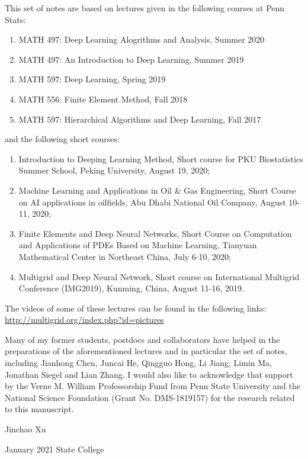 \documentclass[leqno,labelfig,psfigt,colorlinks]{svmono}
\begin{document}
This set of notes are based on lectures given in the following courses
at Penn State:
\begin{enumerate}
\item MATH 497: Deep Learning Alogrithms and Analysis, Summer 2020 
\item MATH 497: An Introduction to Deep Learning, Summer 2019
\item MATH 597: Deep Learning, Spring 2019 
\item MATH 556: Finite Element Method, Fall 2018
\item MATH 597: Hierarchical Algorithms and Deep Learning, Fall 2017
\end{enumerate}
and the following short courses:
\begin{enumerate}
\item Introduction to Deeping Learning Method, Short course for PKU Biostatistics Summer School, Peking University, August 19, 2020; 
\item Machine Learning and Applications in Oil \& Gas Engineering, Short Course on AI applications in oilfields, Abu Dhabi National Oil Company, August 10-11, 2020;
\item Finite Elements and Deep Neural Networks, Short Course on Computation and Applications of PDEs Based on Machine Learning, Tianyuan Mathematical Center in Northeast China, July 6-10, 2020;
\item Multigrid and Deep Neural Network, Short course on International Multigrid Conference (IMG2019), Kunming, China, August 11-16, 2019.
\end{enumerate}

The videos of some of these lectures can be found in the following links: 
\href{http://multigrid.org/index.php?id=pictures}{http://multigrid.org/index.php?id=pictures}

Many of my former students, postdocs and collaborators have helped in
the preparations of the aforementioned lectures and in particular the
set of notes, including Jianhong Chen, Juncai He, Qingguo Hong, Li
Jiang, Limin Ma, Jonathan Siegel and Lian Zhang.  I would also like to
acknowledge that support by the Verne M. William Professorship Fund
from Penn State University and the National Science Foundation (Grant
No. DMS-1819157) for the research related to this manuscript. 

\bigskip

\noindent Jinchao Xu

\noindent January 2021 State College


\end{document}
